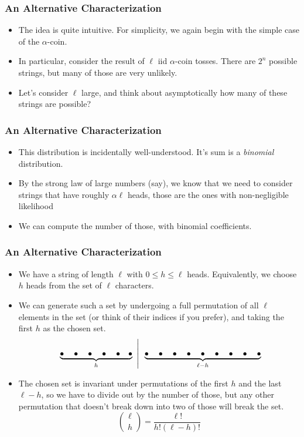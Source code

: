 \documentclass[xcolor=dvipsnames]{beamer}
\begin{document}
	\begin{frame}
	\frametitle{An Alternative Characterization}
	\begin{itemize}
    	\item  The idea is quite intuitive. For simplicity, we again begin with the simple case of the $\alpha$-coin. 
    	\pause
    	\item In particular, consider the result of $\ell$ iid $\alpha$-coin tosses. There are $2^n$ possible strings, but many of those are very unlikely. 
    	\pause
    	\item Let's consider $\ell$ large, and think about asymptotically how many of these strings are possible? 
	\end{itemize}
	\end{frame}
	
	\begin{frame}
	\frametitle{An Alternative Characterization}
	    \begin{itemize}
	        \item This distribution is incidentally well-understood. It's sum is a \textit{binomial} distribution. 
	        \pause
	        \item By the strong law of large numbers (say), we know that we need to consider strings that have roughly $\alpha \ell$ heads, those are the ones with non-negligible likelihood
	        \item We can compute the number of those, with binomial coefficients. 
	    \end{itemize}
	\end{frame}
	
	\begin{frame}
	\frametitle{An Alternative Characterization}
	    \begin{itemize}
	        \item We have a string of length $\ell$ with $0 \leq h \leq \ell$ heads. Equivalently, we  choose $h$ heads from the set of $\ell$ characters.
	        \pause 
	        \item We can generate such a set by undergoing a full permutation of all $\ell$ elements in the set (or think of their indices if you prefer), and taking the first $h$ as the chosen set. 
	        $$ \left. \vphantom{\int} \underbrace{\bullet \quad \bullet \quad \bullet \quad \bullet \quad \bullet \quad \bullet}_h \enspace \right| \enspace \underbrace{\bullet \quad \bullet \quad \bullet \quad \bullet \quad \bullet \quad \bullet \quad \bullet \quad \bullet \quad \bullet}_{\ell - h} $$
	        \pause 
	        \item The chosen set is invariant under permutations of the first $h$ and the last $\ell - h$, so we have to divide out by the number of those, but any other permutation that doesn't break down into two of those will break the set. \pause $$ \displaystyle {\ell \choose h} = \frac{\ell!}{h!(\ell - h)!} $$
	    \end{itemize}
	\end{frame}
	
\end{document}
